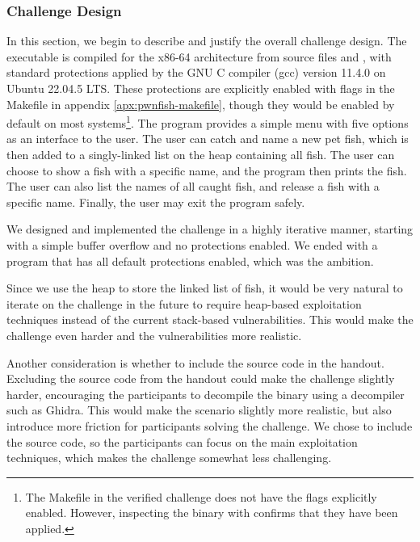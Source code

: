 \subsubsection{Challenge Design}
In this section, we begin to describe and justify the overall challenge design.
The  executable is compiled for the x86-64 architecture\cite{x86-64} from source files  and , with standard protections applied by the GNU C compiler (gcc)\cite{gcc} version 11.4.0 on Ubuntu 22.04.5 LTS. These protections are explicitly enabled with flags in the Makefile in appendix \ref{apx:pwnfish-makefile}, though they would be enabled by default on most systems\footnote{The Makefile in the verified challenge does not have the flags explicitly enabled. However, inspecting the binary with  confirms that they have been applied.}.
The program provides a simple menu with five options as an interface to the user. The user can catch and name a new pet fish, which is then added to a singly-linked list on the heap containing all fish. The user can choose to show a fish with a specific name, and the program then prints the fish. The user can also list the names of all caught fish, and release a fish with a specific name. Finally, the user may exit the program safely.

We designed and implemented the challenge in a highly iterative manner, starting with a simple buffer overflow and no protections enabled. We ended with a program that has all default protections enabled, which was the ambition.

Since we use the heap to store the linked list of fish, it would be very natural to iterate on the challenge in the future to require heap-based exploitation techniques instead of the current stack-based vulnerabilities. This would make the challenge even harder and the vulnerabilities more realistic.

Another consideration is whether to include the source code in the handout. Excluding the source code from the handout could make the challenge slightly harder, encouraging the participants to decompile the binary using a decompiler such as Ghidra\cite{ghidra}. This would make the scenario slightly more realistic, but also introduce more friction for participants solving the challenge. We chose to include the source code, so the participants can focus on the main exploitation techniques, which makes the challenge somewhat less challenging.

